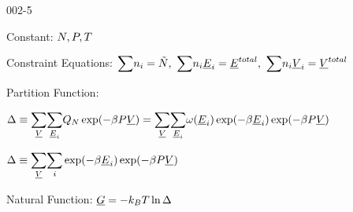 \begin{mitframe}{002-5} %

    
	\begin{listone}
    
    	\item Constant: $\nummoles, \p, \Temp$

   		\item Constraint Equations: $\mathlarger\sum\nolimits \molspecies{i} = \totmoles,~\mathlarger\sum\nolimits \molspecies{i}\uline{\energy}_{i} = \uline{\energy}^{total},~\mathlarger\sum\nolimits \molspecies{i}\uline{\vol}_{i} = \uline{\vol}^{total}  $     %
    
    	\item Partition Function:
    
    	\begin{listtwo}
    
    		\item $\iipf \equiv \mathlarger\sum\limits_{\uline{\vol}}\mathlarger\sum\limits_{\uline{\energy}_{i}} \cpf\exp(-\boltznorm\p\uline{\vol}) = \mathlarger\sum\limits_{\uline{\vol}}\mathlarger\sum\limits_{\uline{\energy}_{i}} \mpf(\uline{\energy}_{i})\exp(-\boltznorm\uline{\energy}_{i})\exp(-\boltznorm\p\uline{\vol}) $
    
    		\item $\iipf \equiv \mathlarger\sum\limits_{\uline{\vol}}\mathlarger\sum\limits_{i} \exp(-\boltznorm\uline{\energy}_{i})\exp(-\boltznorm\p\uline{\vol}) $
    
    	\end{listtwo}
        
    	\item Natural Function: $\uline{\gibbs} = -\boltz\Temp\ln\iipf$    
    
	\end{listone}
    
\end{mitframe}